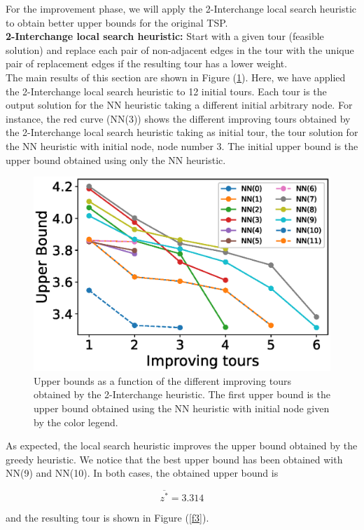 \documentclass[12pt]{article}
\begin{document}
For the improvement phase, we will apply the 2-Interchange local search heuristic to obtain better upper bounds for the original TSP.\\

\textbf{2-Interchange local search heuristic:} Start with a given tour (feasible solution) and replace each pair of non-adjacent edges in the tour with the unique pair of replacement edges if the resulting tour has a lower weight.\\

The main results of this section are shown in Figure (\ref{f2}). Here, we have applied the 2-Interchange local search heuristic to 12 initial tours. Each tour is the output solution for the NN heuristic taking a different initial arbitrary node. For instance, the red curve (NN(3)) shows the different improving tours obtained by the 2-Interchange local search heuristic taking as initial tour, the tour solution for the NN heuristic with initial node, node number 3. The initial upper bound is the upper bound obtained using only the NN heuristic.

\begin{figure}[H]
\centering
    \includegraphics[width=0.6\linewidth]{10.eps} 
  \caption{Upper bounds as a function of the different improving tours obtained by the 2-Interchange heuristic. The first upper bound is the upper bound obtained using the NN heuristic with initial node given by the color legend.}
  \label{f2}
\end{figure}

As expected, the local search heuristic improves the upper bound obtained by the greedy heuristic. We notice that the best upper bound has been obtained with NN(9) and NN(10). In both cases, the obtained upper bound is

\begin{equation}
    \overline{z^{*}} = 3.314
\end{equation}

and the resulting tour is shown in Figure (\ref{f3}).
\end{document}

